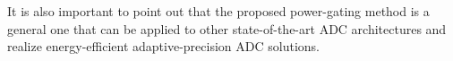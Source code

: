 It is also important to point out that the proposed power-gating method is a general one 
that can be applied to other state-of-the-art ADC architectures and realize energy-efficient 
adaptive-precision ADC solutions. 



